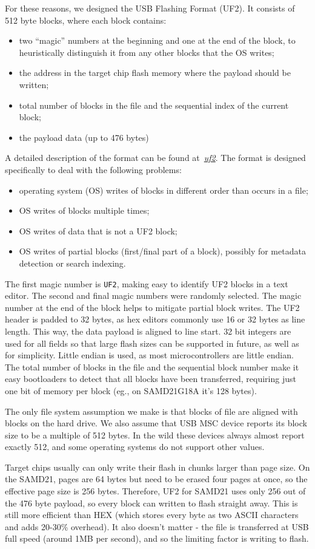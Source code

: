 For these reasons, we designed the USB Flashing Format (UF2). It consists of 512 byte blocks, where each block contains:
\begin{itemize}
\item two ``magic'' numbers at the beginning and one at the end of the block,
to heuristically distinguish it from any other blocks that the OS writes;
\item the address in the target chip flash memory where the payload should be written;
\item total number of blocks in the file and the sequential index of the current block;
\item the payload data (up to 476 bytes)
\end{itemize}
A detailed description of the format can be found at~\emph{\href{https://github.com/microsoft/uf2}{uf2}}.
The format is designed specifically to deal with the following problems:
\begin{itemize}
\item operating system (OS) writes of blocks in different order than occurs in a file;
\item OS writes of blocks multiple times;
\item OS writes of data that is not a UF2 block;
\item OS writes of partial blocks (first/final part of a block), possibly for metadata detection or search indexing.
\end{itemize}

The first magic number is \texttt{UF2}, making easy to identify UF2 blocks in a text editor.
The second and final magic numbers were randomly selected.
The magic number at the end of the block helps to mitigate partial block writes.
The UF2 header is padded to 32 bytes, as hex editors commonly use 16 or 32 bytes as line length. 
This way, the data payload is aligned to line start. 32 bit integers are used for all fields so that 
large flash sizes can be supported in future, as well as for simplicity.
Little endian is used, as most microcontrollers are little endian. 
The total number of blocks in the file and the sequential block number make it easy 
bootloaders to detect that all blocks have been transferred, requiring just one bit of 
memory per block (eg., on SAMD21G18A it's 128 bytes).

The only file system assumption we make is that blocks of file are aligned with blocks on the hard drive. 
We also assume that USB MSC device reports its block size to be a multiple of 512 bytes. 
In the wild these devices always almost report exactly 512, and some 
operating systems do not support other values.

Target chips usually can only write their flash in chunks larger than page size. On the SAMD21, pages are 64 bytes 
but need to be erased four pages at once, so the effective page size is 256 bytes. Therefore, UF2 for SAMD21 uses 
only 256 out of the 476 byte payload, so every block can written to flash straight away. This is still more 
efficient than HEX (which stores every byte as two ASCII characters and adds 20-30\% overhead). It also doesn’t 
matter - the file is transferred at USB full speed (around 1MB per second), and so the limiting factor is writing 
to flash.
